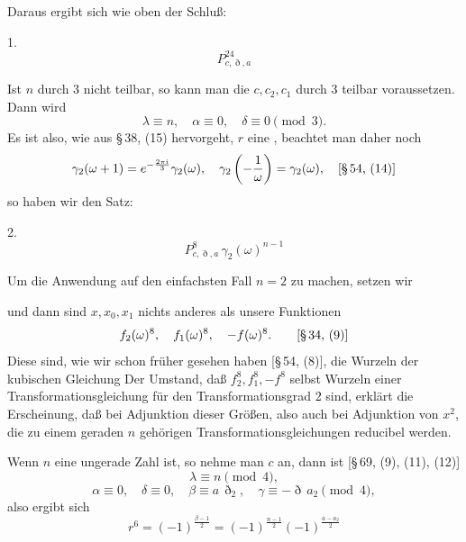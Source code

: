 Daraus ergibt sich wie oben der Schluß:

1. 
\[
P^{24}_{c,\eth,a}
\]

Ist $n$ durch 3 nicht teilbar, so kann man die $c, c_2, c_1$ durch
3 teilbar voraussetzen. Dann wird
\[
\lambda \equiv n, \quad \alpha \equiv 0, \quad \delta \equiv 0 \pmod{3}.
\]
Es ist also, wie aus §\,38, (15) hervorgeht, $r$ eine , beachtet man daher noch
\[
\gamma_2(\omega+1) = e^{-\frac{2\pi i}{3}}\gamma_2(\omega), \quad
\gamma_2\left(-\frac{1}{\omega}\right) = \gamma_2(\omega), \quad \text{[§\,54, (14)]}
\]
so haben wir den Satz:

2. 
\[
P^{8}_{c,\eth,a}\,\gamma_2(\omega)^{n-1}
\]

Um die Anwendung auf den einfachsten Fall $n=2$ zu machen, setzen wir


und dann sind $x, x_0, x_1$ nichts anderes als unsere Funktionen
\[
f_2(\omega)^8, \quad f_1(\omega)^8, \quad -f(\omega)^8. \qquad \text{[§\,34, (9)]}
\]
Diese sind, wie wir schon früher gesehen haben [§\,54, (8)], die
Wurzeln der kubischen Gleichung
Der Umstand, daß $f_2^8, f_1^8, -f^8$ selbst Wurzeln einer Transformationsgleichung für den Transformationsgrad 2 sind, erklärt die
Erscheinung, daß bei Adjunktion dieser Größen, also auch bei
Adjunktion von $x^2$, die zu einem geraden $n$ gehörigen Transformationsgleichungen reducibel werden.

Wenn $n$ eine ungerade Zahl ist, so nehme man $c$ 
an, dann ist [§\,69, (9), (11), (12)]
\[
\lambda \equiv n \pmod{4},
\]
\[
\alpha \equiv 0, \quad \delta \equiv 0, \quad \beta \equiv a\,\eth_2, \quad \gamma \equiv -\eth\,a_2 \pmod{4},
\]
also ergibt sich
\[
r^6 = (-1)^{\frac{\beta-1}{2}} = (-1)^{\frac{n-1}{2}}(-1)^{\frac{a-a_2}{2}}
\]
